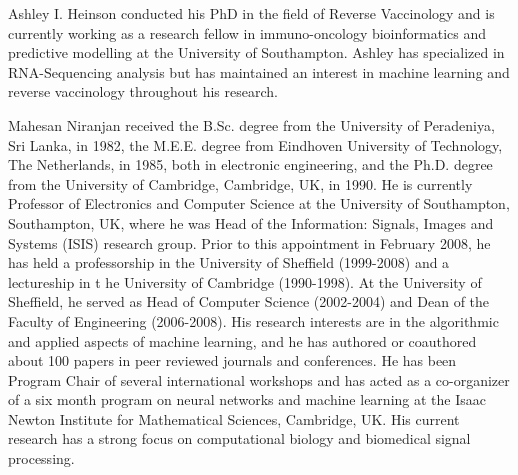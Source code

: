 \documentclass[10pt,journal,compsoc,twoside]{IEEEtran}
\begin{document}
\begin{IEEEbiography}{Ashley I. Heinson}
conducted his PhD in the field of Reverse Vaccinology and is currently working as a research fellow in immuno-oncology bioinformatics and predictive modelling at the University of Southampton. Ashley has specialized in RNA-Sequencing analysis but has maintained an interest in machine learning and reverse vaccinology throughout his research.
\end{IEEEbiography}

\begin{IEEEbiography}{Mahesan Niranjan}
received the B.Sc. degree from the University of Peradeniya, Sri Lanka, in 1982, the M.E.E. degree from Eindhoven University of Technology, The Netherlands, in 1985, both in electronic engineering, and the Ph.D. degree from the University of Cambridge, Cambridge, UK, in 1990. He is currently Professor of Electronics and Computer Science at the University of Southampton, Southampton, UK, where he was Head of the Information: Signals, Images and Systems (ISIS) research group. Prior to this appointment in February 2008, he has held a professorship in the University of Sheffield (1999-2008) and a lectureship in t he University of Cambridge (1990-1998). At the University of Sheffield, he served as Head of Computer Science (2002-2004) and Dean of the Faculty of Engineering (2006-2008). His research interests are in the algorithmic and applied aspects of machine learning, and he has authored or coauthored about 100 papers in peer reviewed journals and conferences. He has been Program Chair of several international workshops and has acted as a co-organizer of a six month program on neural networks and machine learning at the Isaac Newton Institute for Mathematical Sciences, Cambridge, UK. His current research has a strong focus on computational biology and biomedical signal processing.
\end{IEEEbiography}




\end{document}
